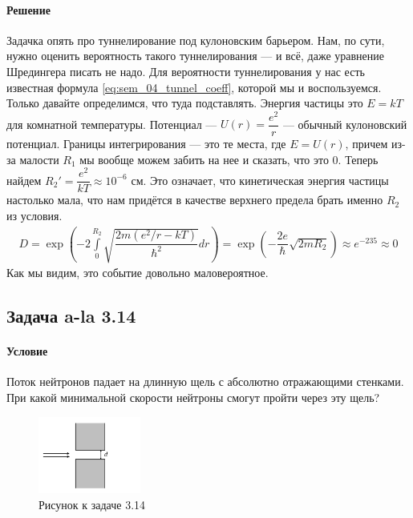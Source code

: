 \documentclass[12pt]{article}
\begin{document}
\paragraph{Решение}
Задачка опять про туннелирование под кулоновским барьером. Нам, по сути, нужно оценить вероятность такого туннелирования --- и всё, даже уравнение Шредингера писать не надо. Для вероятности туннелирования у нас есть известная формула \ref{eq:sem_04_tunnel_coeff}, которой мы и воспользуемся. Только давайте определимся, что туда подставлять. Энергия частицы это $E = kT$ для\vspace{1mm} комнатной температуры. Потенциал ---
$U(r) = \dfrac{e^2}{r}$ --- обычный кулоновский потенциал. Границы \vspace{1mm} интегрирования --- это те места, где $E=U(r)$, причем из-за малости $R_1$ мы вообще можем забить на нее и сказать, что это 0. Теперь найдем $R_2' = \dfrac{e^2}{kT} \approx 10^{-6} \text{ см}$. Это означает, что кинетическая \vspace{1mm} энергия частицы настолько мала, что нам придётся в качестве верхнего предела брать \vspace{1mm} именно $R_2$ из условия. 
\begin{gather*}
     D  = \exp{\left( -2\int\limits_{0}^{R_2}\sqrt{\dfrac{2m(e^2/r-kT)}{\hbar^2}} dr \right)} = \exp{\left( -\dfrac{2e}{\hbar}\sqrt{2mR_2} \right)} \approx e^{-235} \approx 0
\end{gather*}
Как мы видим, это событие довольно маловероятное.

\subsection{Задача a-la 3.14}
\label{task_3.14}
\paragraph{Условие}
Поток нейтронов падает на длинную щель с абсолютно отражающими стенками. При какой минимальной скорости нейтроны смогут пройти через эту щель?
\begin{figure}[h]
    \centering
    \includegraphics[width=0.3\textwidth,height=\textheight,keepaspectratio]{Seminar_04/pics/pic_07.pdf}
    \caption{Рисунок к задаче 3.14}
\end{figure}
\end{document}
